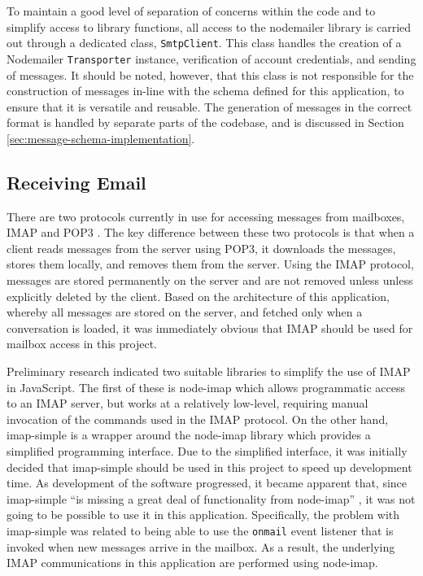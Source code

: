 To maintain a good level of separation of concerns within the code and to simplify access to library functions, all access to the nodemailer library is carried out through a dedicated class, \verb|SmtpClient|. This class handles the creation of a Nodemailer \verb|Transporter| instance, verification of account credentials, and sending of messages. It should be noted, however, that this class is not responsible for the construction of messages in-line with the schema defined for this application, to ensure that it is versatile and reusable. The generation of messages in the correct format is handled by separate parts of the codebase, and is discussed in Section \ref{sec:message-schema-implementation}.

\subsection{Receiving Email}
There are two protocols currently in use for accessing messages from mailboxes, IMAP \cite{imap-rfc} and POP3 \cite{pop-rfc}. The key difference between these two protocols is that when a client reads messages from the server using POP3, it downloads the messages, stores them locally, and removes them from the server. Using the IMAP protocol, messages are stored permanently on the server and are not removed unless unless explicitly deleted by the client. Based on the architecture of this application, whereby all messages are stored on the server, and fetched only when a conversation is loaded, it was immediately obvious that IMAP should be used for mailbox access in this project.

Preliminary research indicated two suitable libraries to simplify the use of IMAP in JavaScript. The first of these is node-imap \cite{node-imap} which allows programmatic access to an IMAP server, but works at a relatively low-level, requiring manual invocation of the commands used in the IMAP protocol. On the other hand, imap-simple \cite{imap-simple} is a wrapper around the node-imap library which provides a simplified programming interface. Due to the simplified interface, it was initially decided that imap-simple should be used in this project to speed up development time. As development of the software progressed, it became apparent that, since imap-simple ``is missing a great deal of functionality from node-imap'' \cite{imap-simple}, it was not going to be possible to use it in this application. Specifically, the problem with imap-simple was related to being able to use the \texttt{onmail} event listener that is invoked when new messages arrive in the mailbox. As a result, the underlying IMAP communications in this application are performed using node-imap.


